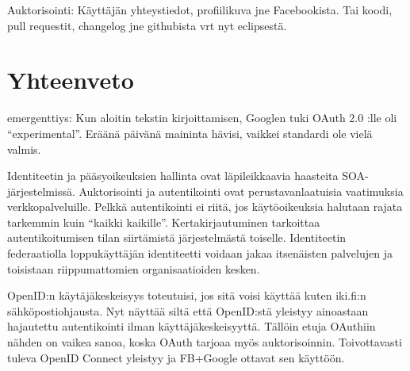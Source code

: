 \documentclass[finnish,gradu]{tktltiki}
\begin{document}
\begin{description}
  Auktorisointi: Käyttäjän yhteystiedot, profiilikuva jne Facebookista. Tai koodi, pull requestit, changelog jne githubista vrt nyt eclipsestä.


  \end{description}






\section{Yhteenveto} %
\label{sec:yhteenveto}

  emergenttiys: Kun aloitin tekstin kirjoittamisen, Googlen tuki OAuth 2.0 :lle oli ``experimental''. Eräänä päivänä maininta hävisi, vaikkei standardi ole vielä valmis. %

  Identiteetin ja pääsyoikeuksien hallinta ovat läpileikkaavia haasteita SOA-järjestelmissä.
  Auktorisointi ja autentikointi ovat perustavanlaatuisia vaatimuksia verkkopalveluille. Pelkkä autentikointi ei riitä, jos käytöoikeuksia halutaan rajata tarkemmin kuin ``kaikki kaikille''. Kertakirjautuminen tarkoittaa autentikoitumisen tilan siirtämistä järjestelmästä toiselle. Identiteetin federaatiolla loppukäyttäjän identiteetti voidaan jakaa itsenäisten palvelujen ja toisistaan riippumattomien organisaatioiden kesken.

    OpenID:n käytäjäkeskeisyys toteutuisi, jos sitä voisi käyttää kuten iki.fi:n sähköpostiohjausta. Nyt näyttää siltä että OpenID:stä yleistyy ainoastaan hajautettu autentikointi ilman käyttäjäkeskeisyyttä. Tällöin etuja OAuthiin nähden on vaikea sanoa, koska OAuth tarjoaa myös auktorisoinnin. Toivottavasti tuleva OpenID Connect yleistyy ja FB+Google ottavat sen käyttöön.
\end{document}
